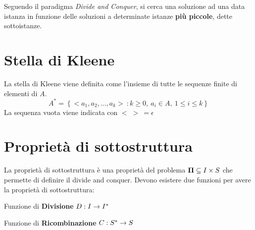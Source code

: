 
Seguendo il paradigma \textit{Divide and Conquer}, si cerca una soluzione ad una data istanza in funzione delle soluzioni a determinate istanze \textbf{più piccole}, dette sottoistanze.

\section{Stella di Kleene}
\begin{definition}\label{def:kleene}
    La stella di Kleene viene definita come l'insieme di tutte le sequenze finite di elementi di $A$.
    $$ A^* = \left\{ < a_1, a_2, \dots, a_k > \: : k \geq 0, \: a_i \in A, \: 1 \leq i \leq k \right\}$$
    La sequenza vuota viene indicata con $ < \; > \: = \epsilon $
\end{definition}

\section{Proprietà di sottostruttura}

La proprietà di sottostruttura è una proprietà del problema $\bm{\Pi}{} \subseteq I{} \times S{} $ che permette di definire il divide and conquer. Devono esistere due funzioni per avere la proprietà di sottostruttura:

\begin{description}
    \item{Funzione di \textbf{Divisione}} $ D : I{} \to I{}^*$
    \item{Funzione di \textbf{Ricombinazione}} $ C : S{}^* \to S{}$
\end{description}

